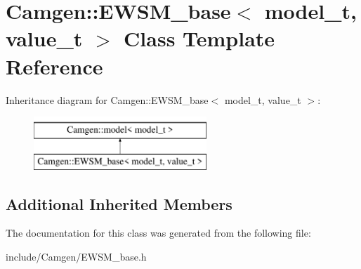 \hypertarget{a00212}{\section{Camgen\-:\-:E\-W\-S\-M\-\_\-base$<$ model\-\_\-t, value\-\_\-t $>$ Class Template Reference}
\label{a00212}
}
Inheritance diagram for Camgen\-:\-:E\-W\-S\-M\-\_\-base$<$ model\-\_\-t, value\-\_\-t $>$\-:\begin{figure}[H]
\begin{center}
\leavevmode
\includegraphics[height=2.000000cm]{a00212}
\end{center}
\end{figure}
\subsection*{Additional Inherited Members}


The documentation for this class was generated from the following file\-:\begin{DoxyCompactItemize}
\item 
include/\-Camgen/E\-W\-S\-M\-\_\-base.\-h\end{DoxyCompactItemize}
